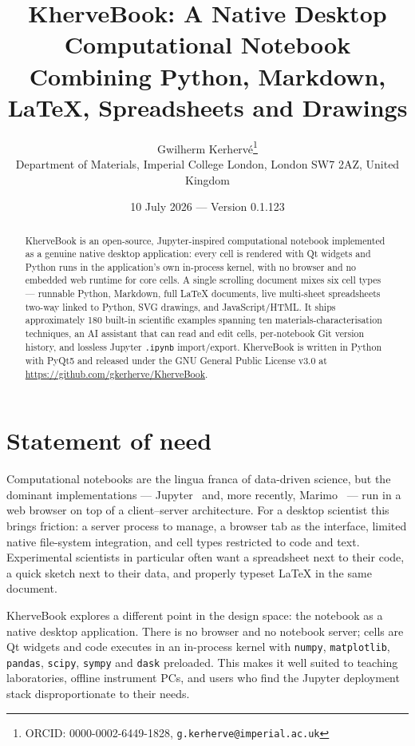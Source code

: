 \documentclass[11pt,a4paper]{article}
\title{KherveBook: A Native Desktop Computational Notebook\\Combining Python, Markdown, LaTeX, Spreadsheets and Drawings}
\author{Gwilherm Kerhervé\thanks{ORCID: 0000-0002-6449-1828, \texttt{g.kerherve@imperial.ac.uk}}\\
\small Department of Materials, Imperial College London, London SW7 2AZ, United Kingdom}
\date{10 July 2026 --- Version 0.1.123}
\begin{document}
\maketitle

\begin{abstract}
KherveBook is an open-source, Jupyter-inspired computational notebook implemented as a genuine native desktop application: every cell is rendered with Qt widgets and Python runs in the application's own in-process kernel, with no browser and no embedded web runtime for core cells. A single scrolling document mixes six cell types --- runnable Python, Markdown, full LaTeX documents, live multi-sheet spreadsheets two-way linked to Python, SVG drawings, and JavaScript/HTML. It ships approximately 180 built-in scientific examples spanning ten materials-characterisation techniques, an AI assistant that can read and edit cells, per-notebook Git version history, and lossless Jupyter \texttt{.ipynb} import/export. KherveBook is written in Python with PyQt5 and released under the GNU General Public License v3.0 at \url{https://github.com/gkerherve/KherveBook}.
\end{abstract}

\section{Statement of need}

Computational notebooks are the lingua franca of data-driven science, but the dominant implementations --- Jupyter~\cite{jupyter} and, more recently, Marimo~\cite{marimo} --- run in a web browser on top of a client--server architecture. For a desktop scientist this brings friction: a server process to manage, a browser tab as the interface, limited native file-system integration, and cell types restricted to code and text. Experimental scientists in particular often want a spreadsheet next to their code, a quick sketch next to their data, and properly typeset LaTeX in the same document.

KherveBook explores a different point in the design space: the notebook as a native desktop application. There is no browser and no notebook server; cells are Qt widgets and code executes in an in-process kernel with \texttt{numpy}, \texttt{matplotlib}, \texttt{pandas}, \texttt{scipy}, \texttt{sympy} and \texttt{dask} preloaded. This makes it well suited to teaching laboratories, offline instrument PCs, and users who find the Jupyter deployment stack disproportionate to their needs.
\end{document}
